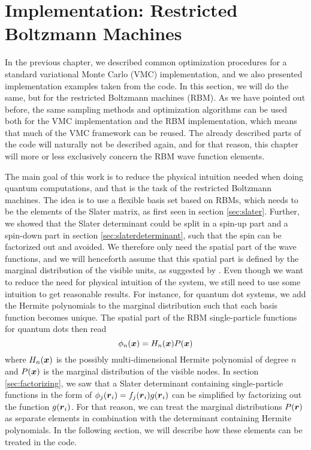 \chapter{Implementation: Restricted Boltzmann Machines} \label{chp:rbmimplementation}
In the previous chapter, we described common optimization procedures for a standard variational Monte Carlo (VMC) implementation, and we also presented implementation examples taken from the code. In this section, we will do the same, but for the restricted Boltzmann machines (RBM). As we have pointed out before, the same sampling methods and optimization algorithms can be used both for the VMC implementation and the RBM implementation, which means that much of the VMC framework can be reused. The already described parts of the code will naturally not be described again, and for that reason, this chapter will more or less exclusively concern the RBM wave function elements.

The main goal of this work is to reduce the physical intuition needed when doing quantum computations, and that is the task of the restricted Boltzmann machines. The idea is to use a flexible basis set based on RBMs, which needs to be the elements of the Slater matrix, as first seen in section \ref{sec:slater}. Further, we showed that the Slater determinant could be split in a spin-up part and a spin-down part in section \ref{sec:slaterdeterminant}, such that the spin can be factorized out and avoided. We therefore only need the spatial part of the wave functions, and we will henceforth assume that this spatial part is defined by the marginal distribution of the visible units, as suggested by \citet{carleo_solving_2017}. Even though we want to reduce the need for physical intuition of the system, we still need to use some intuition to get reasonable results. For instance, for quantum dot systems, we add the Hermite polynomials to the marginal distribution such that each basis function becomes unique. The spatial part of the RBM single-particle functions for quantum dots then read
\begin{equation}
\phi_n(\boldsymbol{{x}})=H_n(\boldsymbol{{x}})P(\boldsymbol{{x}})
\end{equation}
where $H_n(\boldsymbol{{x}})$ is the possibly multi-dimensional Hermite polynomial of degree $n$ and $P(\boldsymbol{{x}})$ is the marginal distribution of the visible nodes. In section \ref{sec:factorizing}, we saw that a Slater determinant containing single-particle functions in the form of $\phi_j(\boldsymbol{{r}}_i)=f_j(\boldsymbol{{r}}_i)g(\boldsymbol{{r}}_i)$ can be simplified by factorizing out the function $g(\boldsymbol{{r}}_i)$. For that reason, we can treat the marginal distributions $P(\boldsymbol{{r}})$ as separate elements in combination with the determinant containing Hermite polynomials. In the following section, we will describe how these elements can be treated in the code. 

